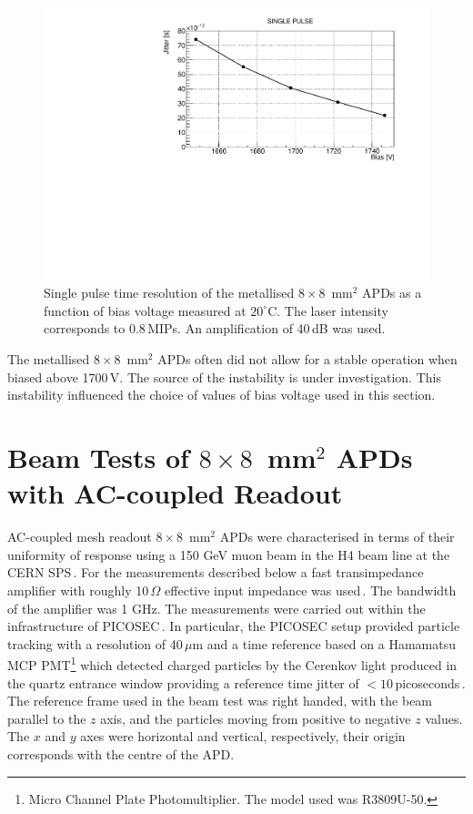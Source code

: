 \documentclass[review,number,sort&compress]{elsarticle}
\begin{document}
\begin{figure}
  \centering
  \includegraphics[width = 0.6 \columnwidth]{timeRes8x8metal}
  \caption{Single pulse time resolution of the metallised $8 \times 8$~mm$^2$ APDs as a function of bias voltage measured at $20^\circ$C. The laser intensity corresponds to 0.8\,MIPs. An amplification of 40\,dB was used.}
  \label{fig:timeRes8x8metal}
\end{figure}

The metallised $8 \times 8$~mm$^2$ APDs often did not allow for a stable operation when biased above 1700\,V.
The source of the instability is under investigation.
This instability influenced the choice of values of bias voltage used in this section.

\section{Beam Tests of $8 \times 8$~mm$^2$ APDs with AC-coupled Readout}
\label{sec:tb8x8}

AC-coupled mesh readout $8 \times 8$~mm$^2$ APDs were characterised in terms of their uniformity of response using a 150 GeV muon beam in the H4 beam line at the CERN SPS\,\cite{h4page}.
For the measurements described below a fast transimpedance amplifier with roughly 10\,$\Omega$ effective input impedance was used\,\cite{whiteACES2014}.
The bandwidth of the amplifier was 1 GHz.
The measurements were carried out within the infrastructure of PICOSEC\,\cite{bortfeld2018}.
In particular, the PICOSEC setup provided particle tracking with a resolution of 40\,$\mu$m and a time reference based on a Hamamatsu MCP PMT\footnote{Micro Channel Plate Photomultiplier. The model used was R3809U-50.} which detected charged particles by the Cerenkov light produced in the quartz entrance window providing a reference time jitter of $<10$\,picoseconds\,\cite{sohl2018}.
The reference frame used in the beam test was right handed, with the beam parallel to the $z$ axis, and the particles moving from positive to negative $z$ values.
The $x$ and $y$ axes were horizontal and vertical, respectively, their origin corresponds with the centre of the APD.
\end{document}
